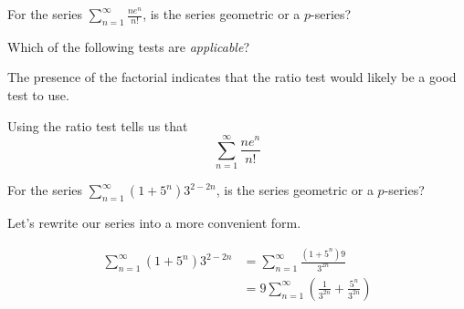 \documentclass{ximera}
\begin{document}
\begin{exercise}
\begin{hint}
\begin{question}
\begin{multipleChoice}
\end{multipleChoice}


\end{question}

\begin{question}
For the series  $\sum_{n=1}^{\infty} \frac{ne^n}{n!}$, is the series geometric or a $p$-series?

\begin{multipleChoice}
\end{multipleChoice}


 Which of the following tests are \emph{applicable}?

\begin{selectAll}
\end{selectAll}


The presence of the factorial indicates that the ratio test would likely be a good test to use. 

Using the ratio test tells us that 
\[
\sum_{n=1}^{\infty} \frac{ne^n}{n!}
\]

\begin{multipleChoice}
\end{multipleChoice}

\end{question}

\begin{question}

For the series $\sum_{n=1}^{\infty}(1+5^n)3^{2-2n}$, is the series geometric or a $p$-series?

\begin{multipleChoice}
\end{multipleChoice}

Let's rewrite our series into a more convenient form. 

\begin{align*}
\sum^{\infty}_{n=1} (1+5^n)3^{2-2n}&=\sum^{\infty}_{n=1}\frac{(1+5^n)9}{3^{2n}} \\
&=9\sum^{\infty}_{n=1} \left( \frac{1}{3^{2n}} + \frac{5^n}{3^{2n}} \right)
\end{align*}


\end{question}
\end{hint}
\end{exercise}
\end{document}
